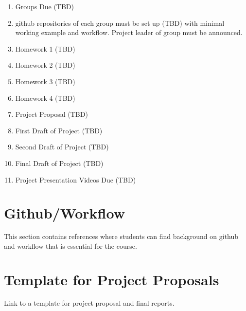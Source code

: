 \documentclass[11pt]{article}
\begin{document}
\begin{enumerate}
\item Groups Due (TBD)
\item github repositories of each group must be set up (TBD) with minimal working example and workflow. Project leader of group must be announced. 
\item Homework 1 (TBD)
\item Homework 2 (TBD)
\item Homework 3 (TBD)
\item Homework 4 (TBD)
\item Project Proposal (TBD)
\item First Draft of Project (TBD)
\item Second Draft of Project (TBD)
\item Final Draft of Project (TBD)
\item Project Presentation Videos Due (TBD)
\end{enumerate} 

\section{Github/Workflow}
This section contains references where students can find background on github and workflow that is essential for the course. 


\section{Template for Project Proposals}

Link to a template for project proposal and final reports. 
\end{document}
